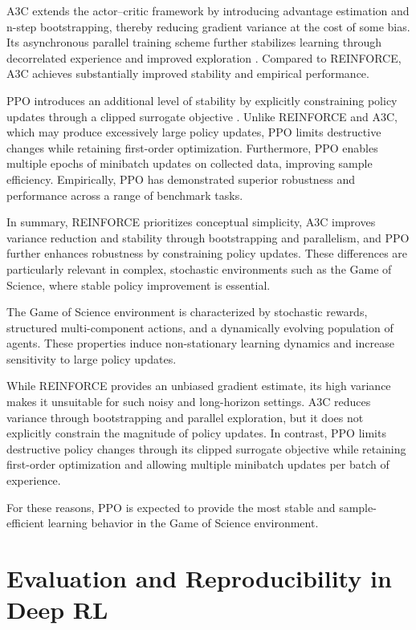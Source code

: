 \documentclass[english,bachelor]{hsluthesis}
\begin{document}
A3C extends the actor--critic framework by introducing advantage estimation and n-step bootstrapping, thereby reducing gradient variance at the cost of some bias. Its asynchronous parallel training scheme further stabilizes learning through decorrelated experience and improved exploration \cite{mnih2016asynchronousmethodsdeepreinforcement}. Compared to REINFORCE, A3C achieves substantially improved stability and empirical performance.

PPO introduces an additional level of stability by explicitly constraining policy updates through a clipped surrogate objective \cite{schulman2017proximalpolicyoptimizationalgorithms}. Unlike REINFORCE and A3C, which may produce excessively large policy updates, PPO limits destructive changes while retaining first-order optimization. Furthermore, PPO enables multiple epochs of minibatch updates on collected data, improving sample efficiency. Empirically, PPO has demonstrated superior robustness and performance across a range of benchmark tasks.

In summary, REINFORCE prioritizes conceptual simplicity, A3C improves variance reduction and stability through bootstrapping and parallelism, and PPO further enhances robustness by constraining policy updates. These differences are particularly relevant in complex, stochastic environments such as the Game of Science, where stable policy improvement is essential.

The Game of Science environment is characterized by stochastic rewards, structured multi-component actions, and a dynamically evolving population of agents. These properties induce non-stationary learning dynamics and increase sensitivity to large policy updates. 

While REINFORCE provides an unbiased gradient estimate, its high variance makes it unsuitable for such noisy and long-horizon settings. A3C reduces variance through bootstrapping and parallel exploration, but it does not explicitly constrain the magnitude of policy updates. In contrast, PPO limits destructive policy changes through its clipped surrogate objective while retaining first-order optimization and allowing multiple minibatch updates per batch of experience.

For these reasons, PPO is expected to provide the most stable and sample-efficient learning behavior in the Game of Science environment.

\section{Evaluation and Reproducibility in Deep RL}
\end{document}
